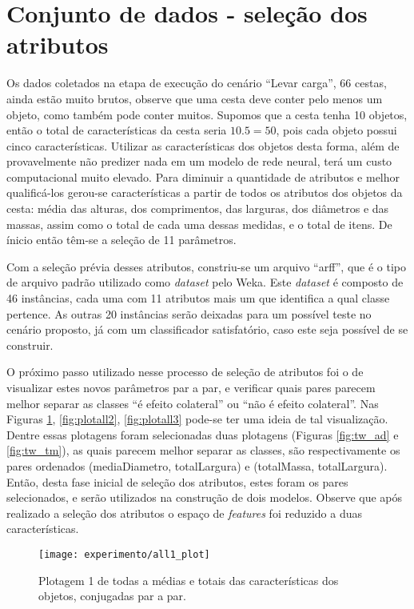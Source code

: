 \section{Conjunto de dados - seleção dos atributos}
\label{sec:construmrn}
Os dados coletados na etapa de execução do cenário ``Levar carga'', 66 cestas, ainda estão muito brutos, observe que uma cesta deve conter pelo menos um objeto, como também pode conter muitos. Supomos que a cesta tenha 10 objetos, então o total de características da cesta seria $10.5=50$, pois cada objeto possui cinco características. Utilizar as características dos objetos desta forma, além de provavelmente não predizer nada em um modelo de rede neural, terá um custo computacional muito elevado. Para diminuir a quantidade de atributos e melhor qualificá-los gerou-se características a partir de todos os atributos dos objetos da cesta: média das alturas, dos comprimentos, das larguras, dos diâmetros e das massas, assim como o total de cada uma dessas medidas, e o total de itens. De ínicio então têm-se a seleção de 11 parâmetros.

Com a seleção prévia desses atributos, constriu-se um arquivo ``arff'', que é o tipo de arquivo padrão utilizado como \textit{dataset} pelo Weka\cite{Hall:2009}. Este \textit{dataset} é composto de 46 instâncias, cada uma com 11 atributos mais um que identifica a qual classe pertence. As outras 20 instâncias serão deixadas para um possível teste no cenário proposto, já com um classificador satisfatório, caso este seja possível de se construir.

O próximo passo utilizado nesse processo de seleção de atributos foi o de visualizar estes novos parâmetros par a par, e verificar quais pares parecem melhor separar as classes ``é efeito colateral'' ou ``não é efeito colateral''. Nas Figuras \ref{fig:plotall1}, \ref{fig:plotall2}, \ref{fig:plotall3} pode-se ter uma ideia de tal visualização. Dentre essas plotagens foram selecionadas duas plotagens (Figuras \ref{fig:tw_ad} e \ref{fig:tw_tm}), as quais parecem melhor separar as classes, são respectivamente os pares ordenados (mediaDiametro, totalLargura) e (totalMassa, totalLargura). Então, desta fase inicial de seleção dos atributos, estes foram os pares selecionados, e serão utilizados na construção de dois modelos. Observe que após realizado a seleção dos atributos o espaço de \textit{features} foi reduzido a duas características.

\begin{figure}[!htb] \centering 
  \centering
  \texttt{[image: experimento/all1\_plot]} 
  \caption{Plotagem 1 de todas a médias e totais das características dos objetos, conjugadas par a par.} 
  \label{fig:plotall1}
\end{figure}

